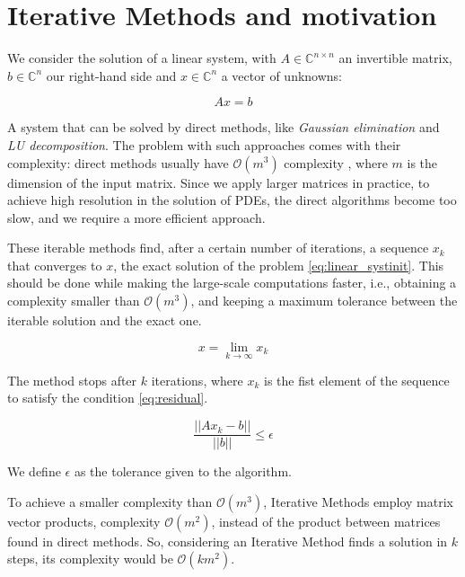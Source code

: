 \section{Iterative Methods and motivation}

We consider the solution of a linear system, with $A \in \mathbb{C}^{n \times n}$ an invertible matrix, $b \in \mathbb{C}^{n}$ our right-hand side and $x\in \mathbb{C}^{n}$ a vector of unknowns:

\begin{equation}\label{eq:linear_systinit}
    Ax=b
\end{equation}

A system that can be solved by direct methods, like \textit{Gaussian elimination} and \textit{LU decomposition}. The problem with such approaches comes with their complexity: direct methods usually have $\mathcal{O}(m^{3})$ complexity \cite{trefethen1998numerical}, where $m$ is the dimension of the input matrix. Since we apply larger matrices in practice, to achieve high resolution in the solution of PDEs, the direct algorithms become too slow, and we require a more efficient approach.


These iterable methods find, after a certain number of iterations, a sequence ${x_{k}}$ that converges to $x$, the exact solution of the problem \ref{eq:linear_systinit}. This should be done while making the large-scale computations faster, i.e., obtaining a complexity smaller than $\mathcal{O}(m^{3})$, and keeping a maximum tolerance between the iterable solution and the exact one.


\begin{equation}\label{eq:suite}
    x = \lim_{k \to \infty} x_{k}
\end{equation}


The method stops after $k$ iterations, where $x_{k}$ is the fist element of the sequence to satisfy the condition \ref{eq:residual}.

\begin{equation}\label{eq:residual}
    \frac{||Ax_{k} - b||}{||b||} \leq \epsilon
\end{equation}

We define $\epsilon$ as the tolerance given to the algorithm.

To achieve a smaller complexity than $\mathcal{O}(m^{3})$, Iterative Methods employ matrix vector products, complexity $\mathcal{O}(m^{2})$, instead of the product between matrices found in direct methods. So, considering an Iterative Method finds a solution in $k$ steps, its complexity would be $\mathcal{O}(km^{2})$.


